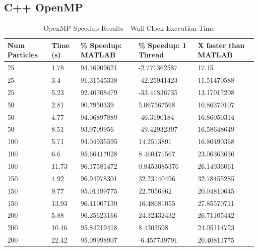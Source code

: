 \subsection{C++ OpenMP}
\begin{table}[H]
    \centering
    \begin{tabular}{@{}lllll@{}}
    \toprule
    \textbf{Num Particles} & \textbf{Time (s)} & \textbf{\% Speedup: MATLAB} & \textbf{\% Speedup: 1 Thread} & \textbf{X faster than MATLAB} \\ \midrule
    25  & 1.78  & 94.16909621 & -2.771362587 & 17.15       \\
    25  & 3.4   & 91.31545338 & -42.25941423 & 11.51470588 \\
    25  & 5.23  & 92.40708479 & -33.41836735 & 13.17017208 \\
    50  & 2.81  & 90.7950339  & 5.067567568  & 10.86370107 \\
    50  & 4.77  & 94.06897889 & -46.3190184  & 16.86050314 \\
    50  & 8.51  & 93.9709956  & -49.42932397 & 16.58648649 \\
    100 & 5.71  & 94.04935595 & 14.2513891   & 16.80490368 \\
    100 & 6.6   & 95.66417028 & 8.460471567  & 23.06363636 \\
    100 & 11.73 & 96.17581472 & 0.8453085376 & 26.14936061 \\
    150 & 4.92  & 96.94978301 & 32.23140496  & 32.78455285 \\
    150 & 9.77  & 95.01199775 & 22.7056962   & 20.04810645 \\
    150 & 13.93 & 96.41007139 & 16.48681055  & 27.85570711 \\
    200 & 5.88  & 96.25623166 & 24.32432432  & 26.71105442 \\
    200 & 10.46 & 95.84219418 & 8.4303598    & 24.05114723 \\
    200 & 22.42 & 95.09998907 & -6.457739791 & 20.40811775 \\ \bottomrule
    \end{tabular}
    \caption{OpenMP Speedup Results - Wall Clock Execution Time}
    \label{tab:OpenMP-speedup}
    \end{table}

\newpage